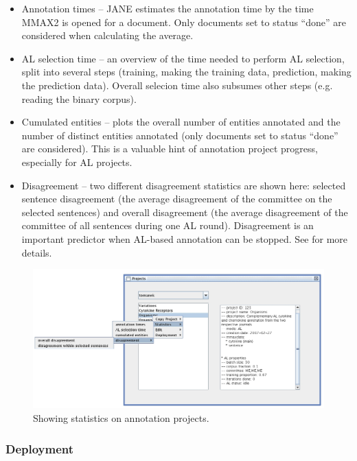 \documentclass[DIV12,english,11pt,halfparskip]{scrartcl}
\begin{document}
\begin{itemize}
\item Annotation times -- JANE estimates the annotation time by the
  time MMAX2 is opened for a document. Only documents set to status
  ``done'' are considered when calculating the average.

\item AL selection time -- an overview of the time needed to perform
  AL selection, split into several steps (training, making the
  training data, prediction, making the prediction data). Overall
  selecion time also subsumes other steps (e.g. reading the binary
  corpus).

\item Cumulated entities -- plots the overall number of entities
  annotated and the number of distinct entities annotated (only
  documents set to status ``done'' are considered). This is a valuable
  hint of annotation project progress, especially for AL projects.

\item Disagreement -- two different disagreement statistics are shown
  here: selected sentence disagreement (the average disagreement of
  the committee on the selected sentences) and overall disagreement
  (the average disagreement of the committee of all sentences during
  one AL round). Disagreement is an important predictor when AL-based
  annotation can be stopped. See \cite{Tomanek2007emnlp} for more
  details.
\end{itemize}

\begin{figure}[h]
  \centering
  \includegraphics[scale=0.5]{figs/ShowProjects_Statistics.jpg}
  \caption{Showing statistics on annotation projects.}
  \label{fig:showprojects_stats}
\end{figure}


\subsubsection{Deployment}
\end{document}
